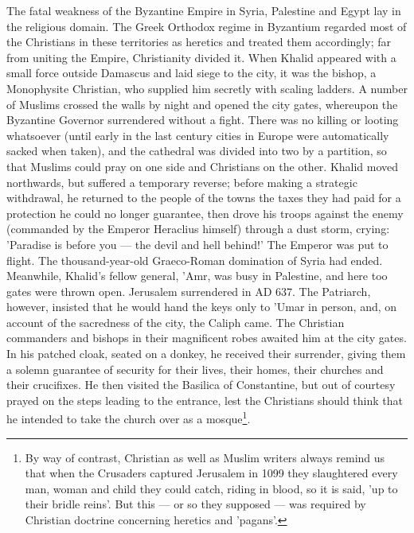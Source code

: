 \documentclass[11pt, b5paper, twoside]{book}
\begin{document}
The fatal weakness of the Byzantine Empire in Syria, Palestine and Egypt lay in the religious domain. The Greek Orthodox regime in Byzantium regarded most of the Christians in these territories as heretics and treated them accordingly; far from uniting the Empire, Christianity divided it. When Khalid appeared with a small force outside Damascus and laid siege to the city, it was the bishop, a Monophysite Christian, who supplied him secretly with scaling ladders. A number of Muslims crossed the walls by night and opened the city gates, whereupon the Byzantine Governor surrendered without a fight. There was no killing or looting whatsoever (until early in the last century cities in Europe were automatically sacked when taken), and the cathedral was divided into two by a partition, so that Muslims could pray on one side and Christians on the other. Khalid moved northwards, but suffered a temporary reverse; before making a strategic withdrawal, he returned to the people of the towns the taxes they had paid for a protection he could no longer guarantee, then drove his troops against the enemy (commanded by the Emperor Heraclius himself) through a dust storm, crying: 'Paradise is before you --- the devil and hell behind!' The Emperor was put to flight. The thousand-year-old Graeco-Roman domination of Syria had ended. \\

Meanwhile, Khalid's fellow general, 'Amr, was busy in Palestine, and here too gates were thrown open. Jerusalem surrendered in AD 637. The Patriarch, however, insisted that he would hand the keys only to 'Umar in person, and, on account of the sacredness of the city, the Caliph came. The Christian commanders and bishops in their magnificent robes awaited him at the city gates. In his patched cloak, seated on a donkey, he received their surrender, giving them a solemn guarantee of security for their lives, their homes, their churches and their crucifixes. He then visited the Basilica of Constantine, but out of courtesy prayed on the steps leading to the entrance, lest the Christians should think that he intended to take the church over as a mosque\footnote{By way of contrast, Christian as well as Muslim writers always remind us that when the Crusaders captured Jerusalem in 1099 they slaughtered every man, woman and child they could catch, riding in blood, so it is said, 'up to their bridle reins'. But this --- or so they supposed --- was required by Christian doctrine concerning heretics and 'pagans'.}.
\end{document}
